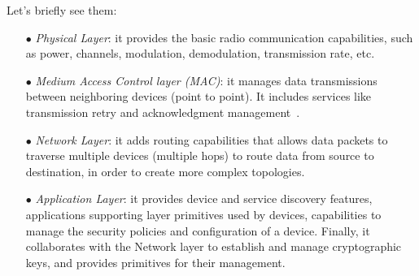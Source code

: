 \documentclass[12pt]{report}
\begin{document}
{{Let's briefly see them: 

\begin{itemize}
\setlength{\itemindent}{+4mm}
\item[$\bullet$] \emph{Physical Layer}: it provides the basic radio communication capabilities, such as power, channels, modulation, demodulation, transmission rate, etc.
\item[$\bullet$] \emph{Medium Access Control layer (MAC)}: it manages data transmissions between neighboring devices (point to point). 
It includes services like transmission retry and acknowledgment management~\cite{digi}.
\item[$\bullet$] \emph{Network Layer}: it adds routing capabilities that allows data packets to traverse multiple devices (multiple hops) to route data from source to destination, in order to create more complex topologies.
\item[$\bullet$] \emph{Application Layer}: it provides device and service discovery features, applications supporting layer primitives used by devices, capabilities to manage the security policies and configuration of a device. Finally, it collaborates with the Network layer to establish and manage cryptographic keys, and provides primitives for their management.

\end{itemize}

}}
\end{document}
